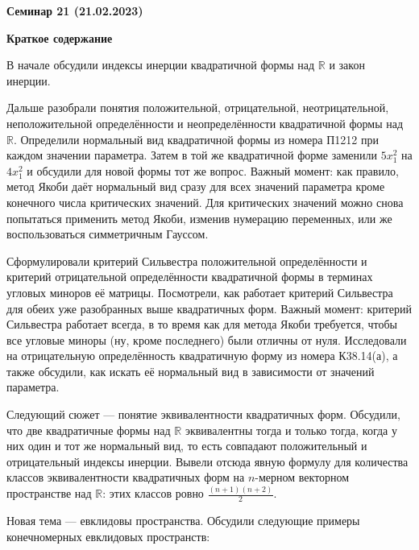 \documentclass[10pt, a4paper]{extarticle}
\def \R{\mathbb{R}}
\theoremstyle{definition}
\begin{document}
\begin{center}
\small
\noindent{}
\end{center}

\large

\begin{center}
\textbf{Семинар 21 (21.02.2023)}
\end{center}

\textbf{Краткое содержание}

В начале обсудили индексы инерции квадратичной формы над $\R$ и закон инерции.

Дальше разобрали понятия положительной, отрицательной, неотрицательной, неположительной определённости и неопределённости квадратичной формы над $\R$.
Определили нормальный вид квадратичной формы из номера П1212 при каждом значении параметра.
Затем в той же квадратичной форме заменили $5x_1^2$ на $4x_1^2$ и обсудили для новой формы тот же вопрос.
Важный момент: как правило, метод Якоби даёт нормальный вид сразу для всех значений параметра кроме конечного числа \guillemotleft критических\guillemotright{} значений.
Для критических значений можно снова попытаться применить метод Якоби, изменив нумерацию переменных, или же воспользоваться симметричным Гауссом.

Сформулировали критерий Сильвестра положительной определённости и критерий отрицательной определённости квадратичной формы в терминах угловых миноров её матрицы.
Посмотрели, как работает критерий Сильвестра для обеих уже разобранных выше квадратичных форм.
Важный момент: критерий Сильвестра работает всегда, в то время как для метода Якоби требуется, чтобы все угловые миноры (ну, кроме последнего) были отличны от нуля.
Исследовали на отрицательную определённость квадратичную форму из номера К38.14(а), а также обсудили, как искать её нормальный вид в зависимости от значений параметра.

Следующий сюжет --- понятие эквивалентности квадратичных форм.
Обсудили, что две квадратичные формы над $\R$ эквивалентны тогда и только тогда, когда у них один и тот же нормальный вид, то есть совпадают положительный и отрицательный индексы инерции.
Вывели отсюда явную формулу для количества классов эквивалентности квадратичных форм на $n$-мерном векторном пространстве над $\R$: этих классов ровно $\frac{(n+1)(n+2)}2$.

Новая тема --- евклидовы пространства.
Обсудили следующие примеры конечномерных евклидовых пространств:
\end{document}
